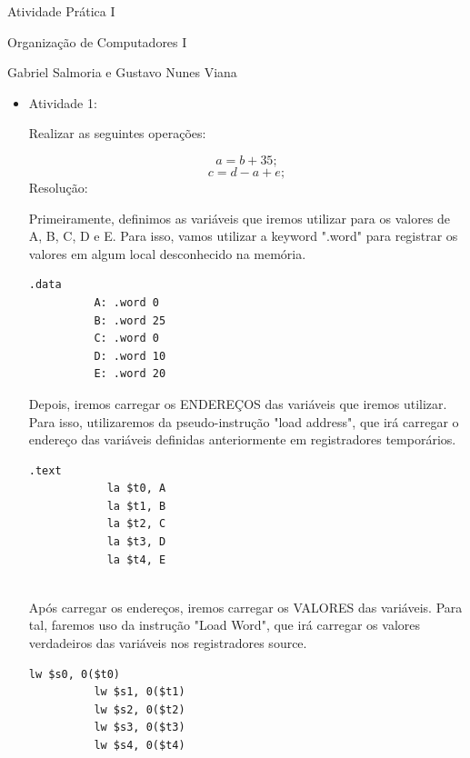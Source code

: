 \documentclass{report}
\begin{document}
\huge

\centerline {Atividade Prática I} 
\centerline {Organização de Computadores I} 

\large

\bigskip

\centerline {Gabriel Salmoria e Gustavo Nunes Viana} 

\begin{itemize}
    
  \bigskip
    \item Atividade 1: 
      
Realizar as seguintes operações:

\skip
$$ a = b + 35; $$ 
$$ c = d - a + e; $$ 
\bigskip
Resolução:

\bigskip
Primeiramente, definimos as variáveis que iremos utilizar
para os valores de A, B, C, D e E. Para isso, vamos utilizar
a keyword ".word" para registrar os valores em algum local 
desconhecido na memória.
\\

\normalsize

\begin{lstlisting}[language=Ant]
        .data
          A: .word 0
          B: .word 25
          C: .word 0
          D: .word 10
          E: .word 20
\end{lstlisting}
\large

Depois, iremos carregar os ENDEREÇOS das variáveis que
iremos utilizar. Para isso, utilizaremos da pseudo-instrução
"load address", que irá carregar o endereço das variáveis definidas
anteriormente em registradores temporários.


\normalsize
\bigskip

\begin{lstlisting}[language=Ant]
          .text
            la $t0, A
            la $t1, B
            la $t2, C
            la $t3, D
            la $t4, E
            
\end{lstlisting}

\large

Após carregar os endereços, iremos carregar os VALORES das
variáveis. Para tal, faremos uso da instrução "Load Word", que
irá carregar os valores verdadeiros das variáveis nos registradores
source.

\normalsize
\bigskip

\begin{lstlisting}[language=Ant]
          lw $s0, 0($t0)
          lw $s1, 0($t1)
          lw $s2, 0($t2)
          lw $s3, 0($t3)
          lw $s4, 0($t4)
\end{lstlisting}



\end{itemize}
\end{document}
